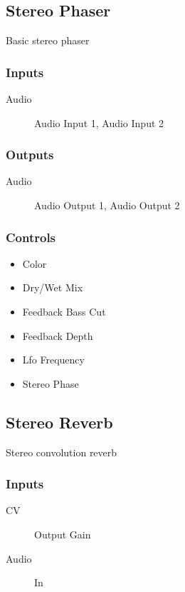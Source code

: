 \subsection{Stereo Phaser}

Basic stereo phaser



\subsubsection{Inputs}
\begin{description}
\item [Audio] Audio Input 1, Audio Input 2
\end{description}

\subsubsection{Outputs}
\begin{description}
\item [Audio] Audio Output 1, Audio Output 2
\end{description}

\subsubsection{Controls}
\begin{itemize}
\item Color
\item Dry/Wet Mix
\item Feedback Bass Cut
\item Feedback Depth
\item Lfo Frequency
\item Stereo Phase
\end{itemize}

\subsection{Stereo Reverb}

Stereo convolution reverb



\subsubsection{Inputs}
\begin{description}
\item [CV] Output Gain
\item [Audio] In
\end{description}

